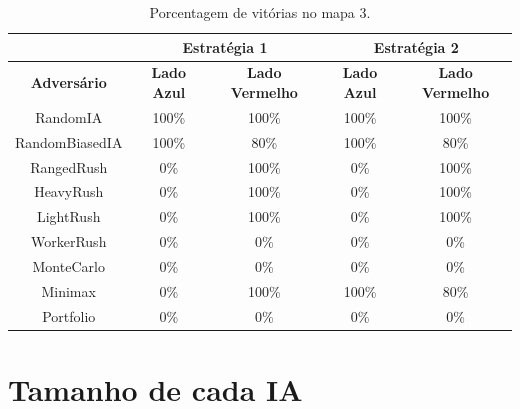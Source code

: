 \begin{table}[ht]
	\centering
	\caption{Porcentagem de vitórias no mapa 3.}
	\label{tab:mapa3}
	\begin{tabular}{|c|cc|cc|}
		\hline
		\textbf{}           & \multicolumn{2}{c|}{\textbf{Estratégia 1}}  & \multicolumn{2}{c|}{\textbf{Estratégia 2}}  \\ \hline
		\textbf{Adversário} & \textbf{Lado Azul} & \textbf{Lado Vermelho} & \textbf{Lado Azul} & \textbf{Lado Vermelho} \\ \hline
		RandomIA            & 100\%              & 100\%                  & 100\%              & 100\%                  \\ \hline
		RandomBiasedIA      & 100\%              & 80\%                   & 100\%              & 80\%                   \\ \hline
		RangedRush          & 0\%                & 100\%                  & 0\%                & 100\%                  \\ \hline
		HeavyRush           & 0\%                & 100\%                  & 0\%                & 100\%                  \\ \hline
		LightRush           & 0\%                & 100\%                  & 0\%                & 100\%                  \\ \hline
		WorkerRush          & 0\%                & 0\%                    & 0\%                & 0\%                    \\ \hline
		MonteCarlo          & 0\%                & 0\%                    & 0\%                & 0\%                    \\ \hline
		Minimax             & 0\%                & 100\%                  & 100\%              & 80\%                   \\ \hline
		Portfolio           & 0\%                & 0\%                    & 0\%                & 0\%                    \\ \hline
	\end{tabular}
\end{table}


\section{Tamanho de cada IA}

